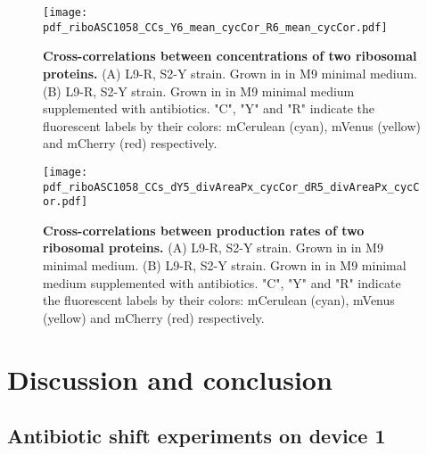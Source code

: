

\begin{figure}
    \centering
    \texttt{[image: pdf\_riboASC1058\_CCs\_Y6\_mean\_cycCor\_R6\_mean\_cycCor.pdf]}
    \caption{ 
        \textbf{Cross-correlations between concentrations of two ribosomal proteins.}
        (A) L9-R, S2-Y strain. Grown in in M9 minimal medium.
        (B) L9-R, S2-Y strain. Grown in in M9 minimal medium supplemented with antibiotics.
        "C", "Y" and "R" indicate the fluorescent labels by their colors: mCerulean (cyan), mVenus (yellow) and mCherry (red) respectively.
    }
    \label{fig:ribo:CCsEERiboribo}
\end{figure}

\begin{figure}
    \centering
    \texttt{[image: pdf\_riboASC1058\_CCs\_dY5\_divAreaPx\_cycCor\_dR5\_divAreaPx\_cycCor.pdf]}
    \caption{ 
        \textbf{Cross-correlations between production rates of two ribosomal proteins.}
        (A) L9-R, S2-Y strain. Grown in in M9 minimal medium.
        (B) L9-R, S2-Y strain. Grown in in M9 minimal medium supplemented with antibiotics.
        "C", "Y" and "R" indicate the fluorescent labels by their colors: mCerulean (cyan), mVenus (yellow) and mCherry (red) respectively.
    }
    \label{fig:ribo:CCsPPRiboribo}
\end{figure}




\section{Discussion and conclusion}


\subsection{Antibiotic shift experiments on device 1}

